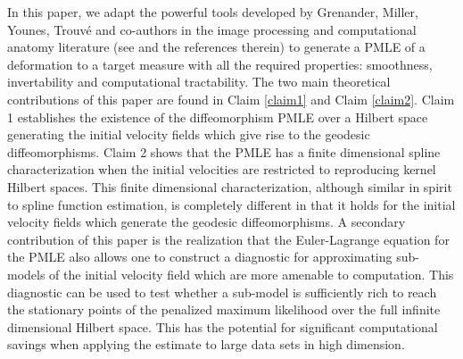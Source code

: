 \documentclass[noinfoline]{imsart}
\begin{document}
In this paper,  we adapt the powerful tools developed by Grenander, Miller,  Younes, Trouv\'e and co-authors in the image processing and computational anatomy literature   (see \cite{you:10} and the references therein) to generate a PMLE of a deformation to a target measure with all the required properties: smoothness, invertability and computational tractability.
The two main theoretical contributions of this paper are found in Claim \ref{claim1}  and Claim \ref{claim2}. Claim 1 establishes the existence of the diffeomorphism PMLE  over a Hilbert space generating the initial velocity fields which give rise to the geodesic diffeomorphisms. Claim 2 shows that the PMLE  has a finite dimensional  spline characterization  when the initial velocities are restricted to reproducing kernel Hilbert spaces. 
This finite dimensional characterization, although similar in spirit to spline function estimation, is completely different in that it holds for the initial velocity fields which generate the geodesic diffeomorphisms. 
  A secondary contribution of this paper is the realization that the Euler-Lagrange equation for the PMLE also allows one to construct a diagnostic for approximating sub-models of the initial velocity field which are more amenable to computation. This diagnostic can be used to test whether a sub-model is sufficiently rich to reach the stationary points of the penalized maximum likelihood over the  full infinite dimensional Hilbert space.  This has the potential for significant computational savings when applying the estimate to large data sets in high dimension.
\end{document}
